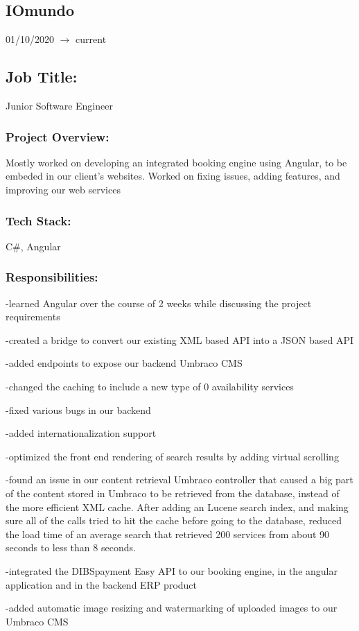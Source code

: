 \documentclass[a4paper,hidelinks,11pt]{article}
\begin{document}
\subsection{IOmundo} 01/10/2020 $\rightarrow$ current
\subsection{Job Title:} Junior Software Engineer
\subsubsection{Project Overview:}
Mostly worked on developing an integrated booking engine using Angular, to be embeded in our client's websites. Worked on fixing issues, adding features, and improving our web services
\subsubsection{Tech Stack:} C\#, Angular
\subsubsection{Responsibilities:}
-learned Angular over the course of 2 weeks while discussing the project requirements

-created a bridge to convert our existing XML based API into a JSON based API

-added endpoints to expose our backend Umbraco CMS

-changed the caching to include a new type of 0 availability services

-fixed various bugs in our backend

-added internationalization support

-optimized the front end rendering of search results by adding virtual scrolling

-found an issue in our content retrieval Umbraco controller that caused a big part of the content stored in Umbraco to be retrieved from the database, instead of the more efficient XML cache. After adding an Lucene search index, and making sure all of the calls tried to hit the cache before going to the database, reduced the load time of an average search that retrieved 200 services from about 90 seconds to less than 8 seconds.

-integrated the DIBSpayment Easy API to our booking engine, in the angular application and in the backend ERP product

-added automatic image resizing and watermarking of uploaded images to our Umbraco CMS
\end{document}
